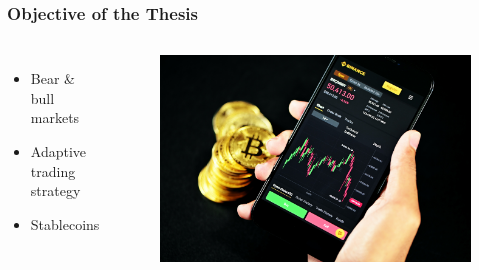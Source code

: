 \begin{frame}
  \frametitle{Objective of the Thesis}
  \begin{columns}
    \begin{itemize}
        \item Bear \& bull markets
        \item Adaptive trading strategy
        \item Stablecoins
    \end{itemize}
     

    \begin{figure}
        \includegraphics[width=\textwidth]{img/bitcoin.jpg}
    \end{figure}
  \end{columns}
\end{frame}






